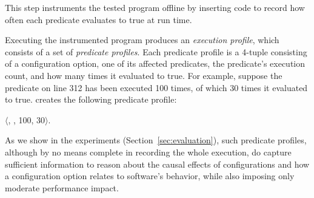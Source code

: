 This step instruments the tested program offline
by inserting code to record how often each predicate evaluates to true
at run time.

% 
% 
% 
% 

Executing the instrumented program produces an \textit{execution profile}, which
consists of a set of \textit{predicate profiles}.
Each predicate profile is a 4-tuple consisting of a configuration option,
one of its affected predicates, the predicate's execution count, and how
many times it evaluated to true. For example,
suppose the predicate on line 312 has been executed 100 times, of which
30 times it evaluated to true. \ourtool creates the following predicate
profile:

\noindent $\langle$, , 100, 30$\rangle$.

\vspace{1mm}


As we show in the experiments (Section~\ref{sec:evaluation}),
such predicate profiles, although by no means complete in
recording the whole execution, do capture
sufficient information to reason about the causal effects of configurations
and how a configuration option relates to software's behavior, while
also imposing only moderate performance impact.


